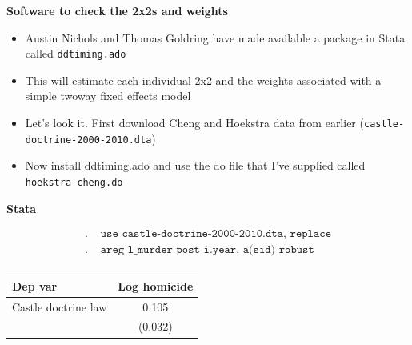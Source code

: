 \documentclass[notes=show]{beamer}
\begin{document}
\begin{frame}[plain]
\begin{center}
\textbf{Software to check the 2x2s and weights}
\end{center}

\begin{itemize}
\item Austin Nichols and Thomas Goldring have made available a package in Stata called \texttt{ddtiming.ado}
\item This will estimate each individual 2x2 and the weights associated with a simple twoway fixed effects model
\item Let's look it.  First download Cheng and Hoekstra data from earlier (\texttt{castle-doctrine-2000-2010.dta})
\item Now install ddtiming.ado and use the do file that I've supplied called \texttt{hoekstra-cheng.do}
\end{itemize}

\end{frame}

\begin{frame}[plain]
\begin{center}
\textbf{Stata}
\end{center}

\begin{align*}
	. &\texttt{ use castle-doctrine-2000-2010.dta, replace}\\
	. &\texttt{ areg l_murder post i.year, a(sid) robust}\\
	\end{align*}
\begin{center}
\begin{tabular}{lc}
\hline 
\multicolumn{1}{l}{Dep var} &
\multicolumn{1}{c}{Log homicide} \\
\hline
Castle doctrine law & 0.105  \\
& (0.032) \\
\hline
\end{tabular}
\end{center}

\end{frame}
\end{document}
